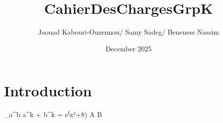 \documentclass{article}
\title{CahierDesChargesGrpK}
\author{Jaouad Kabouri-Ouzennou/ Samy Sadeg/ Beneness Nassim}
\date{December 2025}
\begin{document}
\maketitle

\section{Introduction}


\sum_a^b a^k + b^k = e⁽x²+8) 
A \times B 
\end{document}
